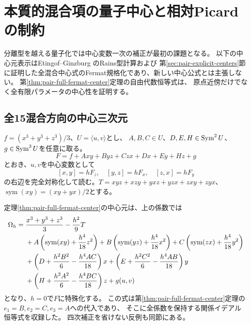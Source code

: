 \section{本質的混合項の量子中心と相対Picardの制約}
\label{sec:mixed-quantum-center}
分離型を越える量子化では中心変数一次の補正が最初の課題となる。
以下の中心元表示はEtingof--Ginzburg \cite[\S9]{EG} のRains型計算および
第\ref{sec:pair-explicit-centers}節に証明した全混合中心式のFermat規格化であり、新しい中心公式とは主張しない。
第\ref{thm:pair-full-fermat-center}定理の自由代数恒等式は、
原点近傍だけでなく全有限パラメータの中心性を証明する。

\subsection{全15混合方向の中心三次元}
$f=(x^3+y^3+z^3)/3$、$U=\langle u,v\rangle$とし、
$A,B,C\in U$、$D,E,H\in\operatorname{Sym}^2U$、$g\in\operatorname{Sym}^3U$を任意に取る。
\begin{equation}\label{eq:full-mixed-fermat}
 F=f+Axy+Byz+Czx+Dx+Ey+Hz+g
\end{equation}
とおき、$u,v$を中心変数として
\begin{equation}\label{eq:full-mixed-brackets}
 [x,y]=hF_z,\quad[y,z]=hF_x,\quad[z,x]=hF_y
\end{equation}
の右辺を完全対称化して読む。$T=xyz+xzy+yxz+yzx+zxy+zyx$、
$\operatorname{sym}(xy)=(xy+yx)/2$とする。

\begin{remark}[Fermat規格化の全混合中心元]\label{rem:full-mixed-center}
定理\ref{thm:pair-full-fermat-center}の中心元は、上の係数では
\begin{align}\label{eq:full-mixed-center}
\Omega_h={}&\frac{x^3+y^3+z^3}{3}-\frac{h^2}{9}T\notag\\
&+A\left(\operatorname{sym}(xy)+\frac{h^4}{18}z^2\right)
 +B\left(\operatorname{sym}(yz)+\frac{h^4}{18}x^2\right)
 +C\left(\operatorname{sym}(zx)+\frac{h^4}{18}y^2\right)\notag\\
&+\left(D+\frac{h^2B^2}{6}-\frac{h^4AC}{18}\right)x
 +\left(E+\frac{h^2C^2}{6}-\frac{h^4AB}{18}\right)y\notag\\
&+\left(H+\frac{h^2A^2}{6}-\frac{h^4BC}{18}\right)z+g(u,v)
\end{align}
となり、$h=0$で$F$に特殊化する。
この式は第\ref{thm:pair-full-fermat-center}定理の$e_1=B,e_2=C,e_3=A$への代入であり、
そこに全係数を保持する関係イデアル恒等式を収録した。
四次補正を省けない反例も同節にある。
\end{remark}

